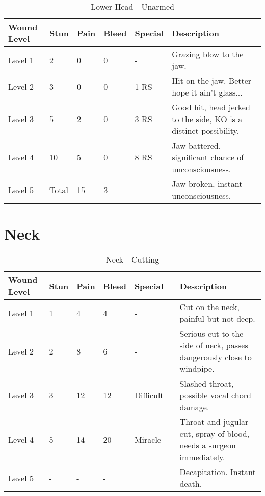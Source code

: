 \documentclass[oneside,11pt,english]{book}
\begin{document}
\begin{table}[!hb] %
	\caption{Lower Head - Unarmed}
	\label{wound:Lower Head - Unarmed}
	\begin{tabu} to 
Wound Level &Stun &Pain &Bleed &Special &Description\\\toprule
Level 1& 2& 0& 0& - &Grazing blow to the jaw.\\
Level 2& 3& 0& 0&  1 RS &Hit on the jaw. Better hope it ain’t glass... \\
Level 3& 5& 2& 0&  3 RS &Good hit, head jerked to the side, KO is a distinct possibility. \\
Level 4& 10& 5& 0&  8 RS &Jaw battered, significant chance of unconsciousness. \\
Level 5& Total &15 &3 & &Jaw broken, instant unconsciousness. \\
	\end{tabu}
\end{table}
	\clearpage

\section{Neck} \vspace{-25pt} \label{sec:neck}
\begin{table}[hb] %
	\caption{Neck - Cutting}
	\label{wound:Neck - Cutting}
	\begin{tabu} to 
Wound Level &Stun &Pain &Bleed &Special &Description\\\toprule
Level 1& 1& 4& 4& - &Cut on the neck, painful but not deep.\\
Level 2& 2& 8& 6& - &Serious cut to the side of neck, passes dangerously close to windpipe.\\
Level 3& 3& 12& 12& Difficult~~ &Slashed throat, possible vocal chord damage.\\
Level 4& 5& 14& 20& Miracle~~&Throat and jugular cut, spray of blood, needs a surgeon immediately.\\
Level 5& - &- &- && Decapitation. Instant death.\\
	\end{tabu}
\end{table}
\end{document}

